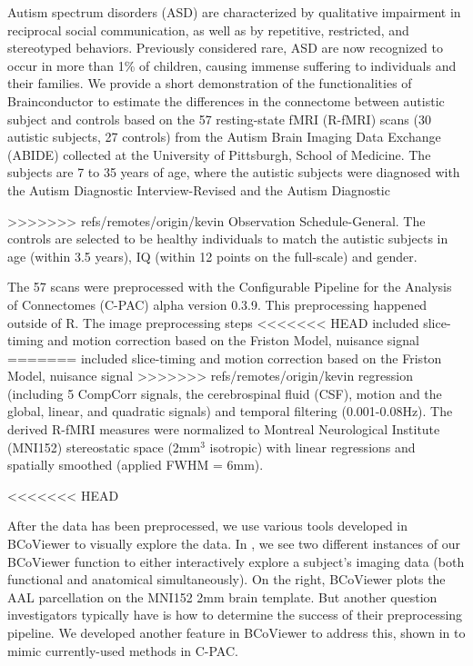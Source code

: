 \documentclass{nature}
\begin{document}
Autism spectrum disorders (ASD) are characterized by qualitative impairment in
reciprocal social communication, as well as by repetitive, restricted, and
stereotyped behaviors. Previously considered rare, ASD are now recognized to
occur in more than 1\% of children, causing immense suffering to individuals and
their families. 
We provide a short demonstration of the functionalities of Brainconductor to
estimate the differences in the connectome between autistic subject and controls
based
on the 57 resting-state fMRI (R-fMRI) scans (30 autistic subjects, 27 controls)
from the Autism
Brain Imaging Data Exchange (ABIDE) collected at the 
University of Pittsburgh, School of Medicine\cite{di2014autism}. 
The subjects are 7 to 35 years of age, where the autistic subjects were
diagnosed with the Autism Diagnostic Interview-Revised and the Autism Diagnostic

>>>>>>> refs/remotes/origin/kevin
Observation Schedule-General. The controls are selected to be healthy
individuals to match the autistic subjects in age (within 3.5 years), IQ (within
12 points on the full-scale) and gender.

The 57 scans were preprocessed with the Configurable Pipeline for the Analysis
of Connectomes (C-PAC) alpha version 0.3.9. This preprocessing 
happened outside of R. The image preprocessing steps
<<<<<<< HEAD
included slice-timing and motion correction based on the Friston Model, nuisance signal
=======
included slice-timing and motion correction based on the Friston Model, nuisance
signal
>>>>>>> refs/remotes/origin/kevin
regression (including 5 CompCorr signals, the cerebrospinal fluid (CSF), motion
 and the global, linear, and quadratic
signals) and temporal filtering (0.001-0.08Hz). The derived R-fMRI measures
were normalized to Montreal Neurological Institute (MNI152) stereostatic
space (2mm$^3$ isotropic) with linear regressions and spatially smoothed
(applied FWHM = 6mm). 

<<<<<<< HEAD

After the data has been preprocessed, we use various tools developed in BCoViewer
to visually explore the data. In , we see two different instances
of our BCoViewer function to either interactively explore a subject's imaging data (both
functional and anatomical simultaneously). On the right, BCoViewer plots the AAL parcellation
on the MNI152 2mm brain template. But another question investigators typically have is 
how to determine the success of their preprocessing pipeline. We developed another feature
in BCoViewer to address this, shown in  to mimic currently-used methods
in C-PAC.
\end{document}
